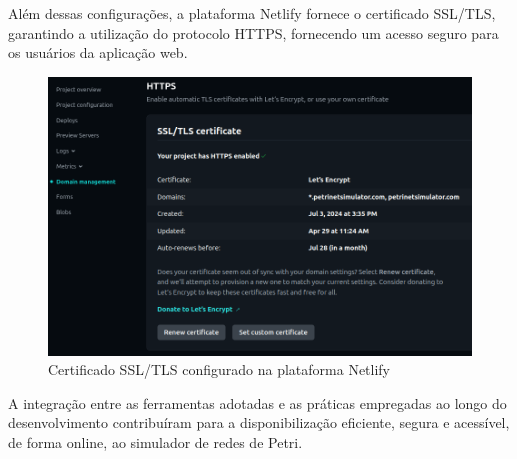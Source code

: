 \documentclass[
	12pt,				%
	openright,			%
	oneside,			%
	a4paper,			%
	english,			%
	brazil				%
	]{abntex2}
\begin{document}
Além dessas configurações, a plataforma Netlify fornece o certificado SSL/TLS, garantindo a utilização do protocolo HTTPS, fornecendo um acesso seguro para os usuários da aplicação web. 

\begin{figure}[ht] 
	\centering
	\includegraphics[scale=0.5]{figuras/netlify3.png}
	\caption[Certificado SSL/TLS configurado na plataforma Netlify]{Certificado SSL/TLS configurado na plataforma Netlify}
	\label{fig:netlify3}
\end{figure}
\FloatBarrier

A integração entre as ferramentas adotadas e as práticas empregadas ao longo do desenvolvimento contribuíram para a disponibilização eficiente, segura e acessível, de forma online, ao simulador de redes de Petri. 



\end{document}
